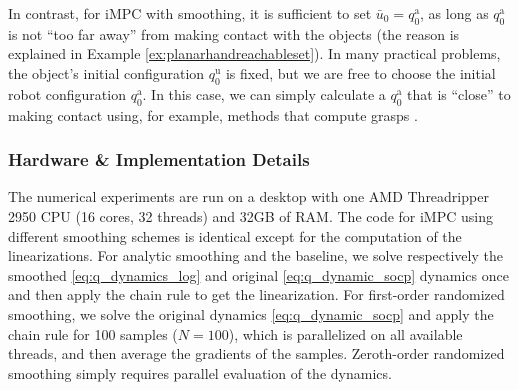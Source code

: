 In contrast, for iMPC with smoothing, it is sufficient to set $\bar{u}_0 = q^\mathrm{a}_0$, as long as $q^\mathrm{a}_0$ is not ``too far away'' from making contact with the objects (the reason is explained in Example \ref{ex:planarhandreachableset}). In many practical problems, the object's initial configuration $q^\mathrm{u}_0$ is fixed, but we are free to choose the initial robot configuration $q^\mathrm{a}_0$. In this case, we can simply calculate a $q^\mathrm{a}_0$ that is ``close'' to making contact using, for example, methods that compute grasps \cite{murray2017mathematical}. 

\subsubsection{Hardware \& Implementation Details}
The numerical experiments are run on a desktop with one AMD Threadripper 2950 CPU (16 cores, 32 threads) and 32GB of RAM. The code for iMPC using different smoothing schemes is identical except for the computation of the linearizations. For analytic smoothing and the baseline, we solve respectively the smoothed \eqref{eq:q_dynamics_log} and original \eqref{eq:q_dynamic_socp} dynamics once and then apply the chain rule to get the linearization. For first-order randomized smoothing, we solve the original dynamics \eqref{eq:q_dynamic_socp} and apply the chain rule for 100 samples ($N=100$), which is parallelized on all available threads, and then average the gradients of the samples. Zeroth-order randomized smoothing simply requires parallel evaluation of the dynamics.


